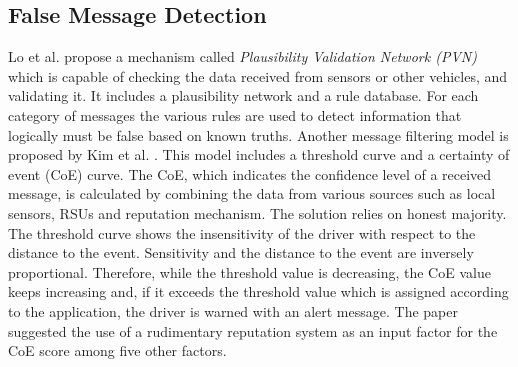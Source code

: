 \documentclass[journal]{IEEEtran}
\begin{document}
\subsection{False Message Detection}
\label{sec:RV:FalseMsgDetection}
Lo et al. \cite{c:IllusionAttack} propose a mechanism called \textit{Plausibility Validation Network (PVN)} which is capable of checking the data received from sensors or other vehicles, and validating it. It includes a plausibility network and a rule database. For each category of messages the various rules are used to detect information that logically must be false based on known truths.
Another  message filtering model is proposed by Kim et al. \cite{c:messagefilterCoE}. This model includes a threshold curve and a certainty of event (CoE) curve. The CoE, which indicates the confidence level of a received message, is calculated by combining the data from various sources such as local sensors, RSUs and reputation mechanism. The solution relies on honest majority. The threshold curve shows the insensitivity of the driver with respect to the distance to the event. Sensitivity and the distance to the event are inversely proportional. Therefore, while the threshold value is decreasing, the CoE value keeps increasing and, if it exceeds the threshold value which is assigned according to the application, the driver is warned with an alert message. The paper suggested the use of a rudimentary reputation system as an input factor for the CoE score among five other factors.
\end{document}
